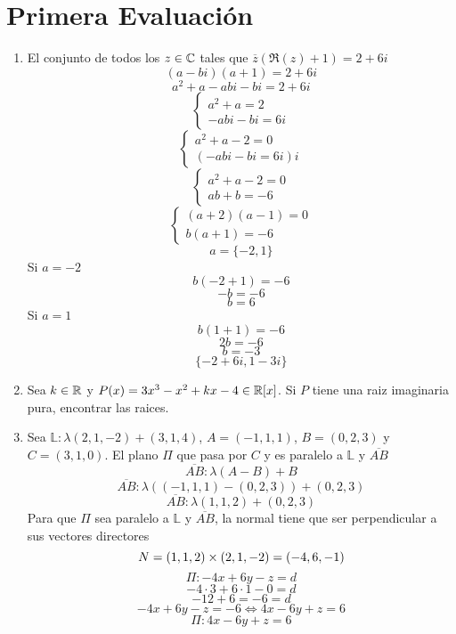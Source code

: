 \documentclass[../practica.root.tex]{subfiles}
\begin{document}
\section{Primera Evaluación}
\begin{enumerate}
    \item El conjunto de todos los $ z \in \mathbb{C} $ tales que $\overline{z}(\Re(z) + 1) = 2 + 6i$
          \[ (a - bi)(a + 1) = 2 + 6i \]
          \[ a^2 + a - abi - bi = 2 + 6i \]
          \[
              \begin{cases}
                  a^2 + a = 2 \\
                  -abi - bi = 6i
              \end{cases}
          \] \[
              \begin{cases}
                  a^2 + a -2 = 0 \\
                  (-abi - bi = 6i)i
              \end{cases}
          \] \[
              \begin{cases}
                  a^2 + a -2 = 0 \\
                  ab + b = -6
              \end{cases}
          \] \[
              \begin{cases}
                  (a + 2)(a - 1) = 0 \\
                  b(a + 1) = -6
              \end{cases}
          \] \[
              a = \{ -2, 1 \}
          \]
          Si $a = -2$
          \[ b(-2 + 1) = -6 \]
          \[ -b = -6 \]
          \[ b = 6 \]
          Si $a = 1$
          \[ b(1 + 1) = -6 \]
          \[ 2b = -6 \]
          \[ b = -3 \]
          \[ \boxed{\{ -2 + 6i, 1 -3i \}} \]

    \item Sea $k \in \mathbb{R}$ y $P(x) = 3x^3 - x^2 + kx - 4 \in \mathbb{R}[x]$. Si $P$ tiene una raiz imaginaria pura, encontrar las raices.


    \item Sea $\mathbb{L}: \lambda(2, 1, -2) + (3,1,4)$, $A = (-1,1,1)$, $B = (0,2,3)$ y $C = (3,1,0)$. El plano $\Pi$ que pasa por $C$ y es paralelo a $\mathbb{L}$ y $\overline{AB}$
          \[ \overline{AB}: \lambda(A-B) + B \]
          \[ \overline{AB}: \lambda((-1,1,1)-(0,2,3)) + (0,2,3) \]
          \[ \overline{AB}: \lambda(1, 1, 2) + (0, 2, 3) \]
          Para que $\Pi$ sea paralelo a $\mathbb{L}$ y $\overline{AB}$, la normal tiene que ser perpendicular a sus vectores directores
          \[ N = (1, 1, 2)\times(2, 1, -2) = (-4, 6, -1) \]
          \[ \Pi : -4x + 6y - z = d \]
          \[ -4\cdot3 + 6\cdot1 - 0 = d \]
          \[ -12 + 6 = -6 = d \]
          \[ -4x + 6y - z = -6 \iff 4x - 6y + z = 6  \]
          \[ \boxed{\Pi : 4x - 6y + z = 6} \]


\end{enumerate}
\end{document}
